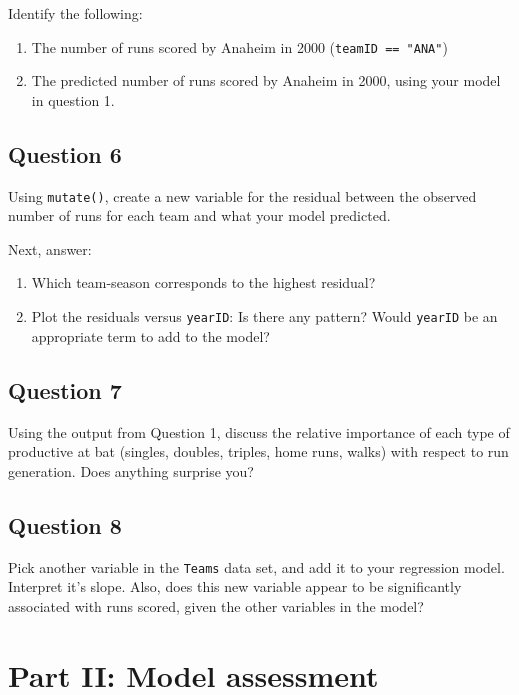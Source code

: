 \documentclass[]{article}
\begin{document}
Identify the following:

\begin{enumerate}
\def\labelenumi{\roman{enumi})}
\item
  The number of runs scored by Anaheim in 2000
  (\texttt{teamID\ ==\ "ANA"})
\item
  The predicted number of runs scored by Anaheim in 2000, using your
  model in question 1.
\end{enumerate}

\hypertarget{question-6}{%
\subsection{Question 6}\label{question-6}}

Using \texttt{mutate()}, create a new variable for the residual between
the observed number of runs for each team and what your model predicted.

Next, answer:

\begin{enumerate}
\def\labelenumi{\roman{enumi})}
\item
  Which team-season corresponds to the highest residual?
\item
  Plot the residuals versus \texttt{yearID}: Is there any pattern? Would
  \texttt{yearID} be an appropriate term to add to the model?
\end{enumerate}

\hypertarget{question-7}{%
\subsection{Question 7}\label{question-7}}

Using the output from Question 1, discuss the relative importance of
each type of productive at bat (singles, doubles, triples, home runs,
walks) with respect to run generation. Does anything surprise you?

\hypertarget{question-8}{%
\subsection{Question 8}\label{question-8}}

Pick another variable in the \texttt{Teams} data set, and add it to your
regression model. Interpret it's slope. Also, does this new variable
appear to be significantly associated with runs scored, given the other
variables in the model?

\hypertarget{part-ii-model-assessment}{%
\section{Part II: Model assessment}\label{part-ii-model-assessment}}
\end{document}
